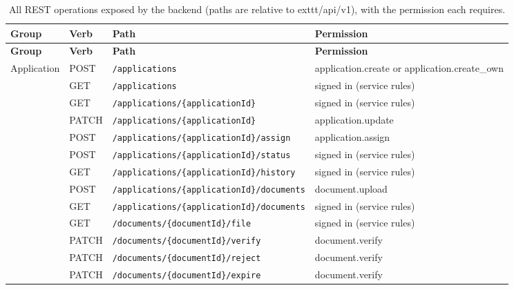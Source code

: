 \begin{longtable}{@{}p{2.1cm}l p{6.6cm} p{3.2cm}@{}}
\caption{All REST operations exposed by the backend (paths are relative to 	exttt{/\allowbreak{}api/\allowbreak{}v1}), with the permission each requires.}\label{tab:apilist}\\
\toprule \textbf{Group} & \textbf{Verb} & \textbf{Path} & \textbf{Permission} \\ \midrule \endfirsthead
\toprule \textbf{Group} & \textbf{Verb} & \textbf{Path} & \textbf{Permission} \\ \midrule \endhead
\bottomrule \endlastfoot
Application & POST & \texttt{/\allowbreak{}applications} & application.create or application.create\_\allowbreak{}own \\
 & GET & \texttt{/\allowbreak{}applications} & signed in (service rules) \\
 & GET & \texttt{/\allowbreak{}applications/\allowbreak{}\{applicationId\}} & signed in (service rules) \\
 & PATCH & \texttt{/\allowbreak{}applications/\allowbreak{}\{applicationId\}} & application.update \\
 & POST & \texttt{/\allowbreak{}applications/\allowbreak{}\{applicationId\}/\allowbreak{}assign} & application.assign \\
 & POST & \texttt{/\allowbreak{}applications/\allowbreak{}\{applicationId\}/\allowbreak{}status} & signed in (service rules) \\
 & GET & \texttt{/\allowbreak{}applications/\allowbreak{}\{applicationId\}/\allowbreak{}history} & signed in (service rules) \\
 & POST & \texttt{/\allowbreak{}applications/\allowbreak{}\{applicationId\}/\allowbreak{}documents} & document.upload \\
 & GET & \texttt{/\allowbreak{}applications/\allowbreak{}\{applicationId\}/\allowbreak{}documents} & signed in (service rules) \\
 & GET & \texttt{/\allowbreak{}documents/\allowbreak{}\{documentId\}/\allowbreak{}file} & signed in (service rules) \\
 & PATCH & \texttt{/\allowbreak{}documents/\allowbreak{}\{documentId\}/\allowbreak{}verify} & document.verify \\
 & PATCH & \texttt{/\allowbreak{}documents/\allowbreak{}\{documentId\}/\allowbreak{}reject} & document.verify \\
 & PATCH & \texttt{/\allowbreak{}documents/\allowbreak{}\{documentId\}/\allowbreak{}expire} & document.verify \\

\end{longtable}
